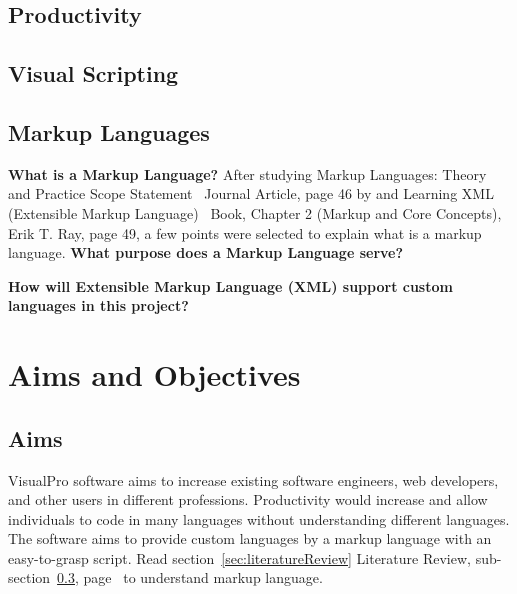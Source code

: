 \documentclass[conference]{IEEEtran}
\begin{document}
      \subsection{Productivity}
      \subsection{Visual Scripting}
      \subsection{Markup Languages}
      \label{subsec:lr-markupLanguages}
        \textbf{What is a Markup Language?}
          After studying Markup Languages: Theory and Practice Scope Statement~\cite{noauthor_markup_1999} Journal Article, page 46 by and Learning XML (Extensible Markup Language)~\cite{ray_learning_nodate} Book, Chapter 2 (Markup and Core Concepts), Erik T. Ray, page 49, a few points were selected to explain what is a markup language.
        \textbf{What purpose does a Markup Language serve?}

        \textbf{How will Extensible Markup Language (XML) support custom languages in this project?}

    \section{Aims and Objectives}
      \subsection{Aims}
        VisualPro software aims to increase existing software engineers, web developers, and other users in different professions. Productivity would increase and allow individuals to code in many languages without understanding different languages. The software aims to provide custom languages by a markup language with an easy-to-grasp script. Read section~\ref{sec:literatureReview} Literature Review, sub-section~\ref{subsec:lr-markupLanguages}, page~\pageref{subsec:lr-markupLanguages} to understand markup language.
\end{document}
